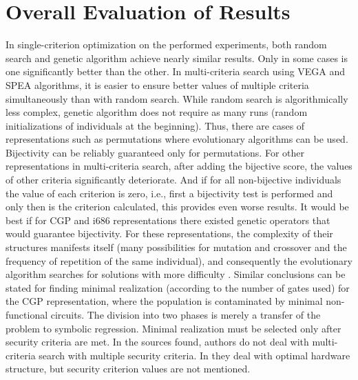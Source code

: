 \section{Overall Evaluation of Results}
In single-criterion optimization on the performed experiments,
both random search and genetic algorithm
achieve nearly similar results. Only in some cases is one significantly better than the other.
In multi-criteria search using VEGA and SPEA algorithms,
it is easier to ensure better values of multiple criteria simultaneously
than with random search. While random search is algorithmically less complex,
genetic algorithm does not require as many runs (random initializations of individuals at the beginning).
Thus, there are cases of representations such as permutations where evolutionary algorithms can be used.
Bijectivity can be reliably guaranteed only for permutations. For other representations in multi-criteria search,
after adding the bijective score, the values of other criteria significantly deteriorate. And if
for all non-bijective individuals the value of each criterion is zero, i.e., first
a bijectivity test is performed and only then is the criterion calculated, this provides
even worse results. It would be best if for CGP and i686 representations there existed
genetic operators that would guarantee bijectivity.
For these representations, the complexity of their structures manifests itself (many possibilities
for mutation and crossover and the frequency of repetition of the same individual), and consequently
the evolutionary algorithm searches for solutions with more difficulty \cite{prednaskyBIN}.
Similar conclusions can be stated for finding minimal realization (according to the number of gates used) for the CGP representation, where
the population is contaminated by minimal non-functional circuits.
The division into two phases is merely a transfer of the problem to symbolic regression. Minimal
realization must be selected only after security criteria are met.
In the sources found, authors do not deal with multi-criteria search with multiple security
criteria.
In \cite{paretoHardware} they deal with optimal hardware structure, but security criterion
values are not mentioned.

